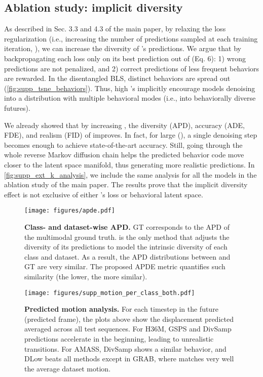 \documentclass[10pt,twocolumn,letterpaper]{article}
\begin{document}
\subsection{Ablation study: implicit diversity} 
\label{subsec:supp_extended_k}

As described in Sec. 3.3 and 4.3 of the main paper, by relaxing the loss regularization (i.e., increasing the number of predictions sampled at each training iteration, ), we can increase the diversity of \modelname{}'s predictions. We argue that by backpropagating each loss only on its best prediction out of  (Eq. 6): 1) wrong predictions are not penalized, and 2) correct predictions of less frequent behaviors are rewarded. In the disentangled BLS, distinct behaviors are spread out (\autoref{fig:supp_tsne_behaviors}). Thus, high 's implicitly encourage models denoising  into a distribution with multiple behavioral modes (i.e., into behaviorally diverse futures).

We already showed that by increasing , the diversity (APD), accuracy (ADE, FDE), and realism (FID) of \modelname{} improves. In fact, for large  (), a single denoising step becomes enough to achieve state-of-the-art accuracy. Still, going through the whole reverse Markov diffusion chain helps the predicted behavior code move closer to the latent space manifold, thus generating more realistic predictions. In \autoref{fig:supp_ext_k_analysis}, we include the same analysis for all the models in the ablation study of the main paper. The results prove that the implicit diversity effect is not exclusive of either \modelname{}'s loss or behavioral latent space. 




\begin{figure*}[t!]
    \centering
    \texttt{[image: figures/apde.pdf]}
    \caption{\textbf{Class- and dataset-wise APD. }GT corresponds to the APD of the multimodal ground truth. \modelname{} is the only method that adjusts the diversity of its predictions to model the intrinsic diversity of each class and dataset. As a result, the APD distributions between \modelname{} and GT are very similar. The proposed APDE metric quantifies such similarity (the lower, the more similar).}
    \label{fig:supp_apde}
\end{figure*}

\begin{figure*}
    \centering
    \texttt{[image: figures/supp\_motion\_per\_class\_both.pdf]}
    \caption{\textbf{Predicted motion analysis. } For each timestep in the future (predicted frame), the plots above show the displacement predicted averaged across all test sequences. For H36M, GSPS and DivSamp predictions accelerate in the beginning, leading to unrealistic transitions. For AMASS, DivSamp shows a similar behavior, and DLow beats all methods except in GRAB, where \modelname{} matches very well the average dataset motion.}
    \label{fig:supp_supp_cmd}
\end{figure*}
\end{document}

